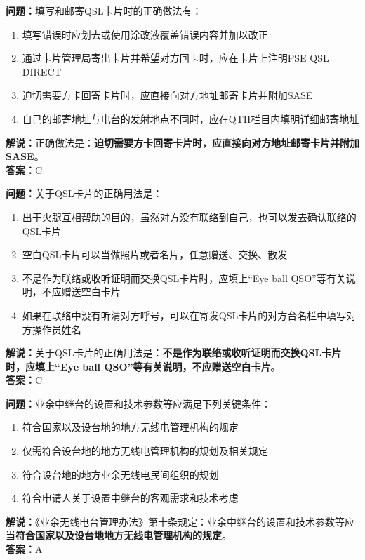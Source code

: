 \documentclass{ctexbook}
\begin{document}
\bigskip


\noindent\textbf{问题：}填写和邮寄QSL卡片时的正确做法有：
\begin{enumerate}[label=\Alph*), leftmargin=3em]
	\item 填写错误时应划去或使用涂改液覆盖错误内容并加以改正
	\item 通过卡片管理局寄出卡片并希望对方回卡时，应在卡片上注明PSE QSL DIRECT
	\item 迫切需要方卡回寄卡片时，应直接向对方地址邮寄卡片并附加SASE
	\item 自己的邮寄地址与电台的发射地点不同时，应在QTH栏目内填明详细邮寄地址
\end{enumerate}
\noindent\textbf{解说：}正确做法是：\textbf{迫切需要方卡回寄卡片时，应直接向对方地址邮寄卡片并附加SASE}。\\\noindent\textbf{答案：}C



\bigskip


\noindent\textbf{问题：}关于QSL卡片的正确用法是：
\begin{enumerate}[label=\Alph*), leftmargin=3em]
	\item 出于火腿互相帮助的目的，虽然对方没有联络到自己，也可以发去确认联络的QSL卡片
	\item 空白QSL卡片可以当做照片或者名片，任意赠送、交换、散发
	\item 不是作为联络或收听证明而交换QSL卡片时，应填上“Eye ball QSO”等有关说明，不应赠送空白卡片
	\item 如果在联络中没有听清对方呼号，可以在寄发QSL卡片的对方台名栏中填写对方操作员姓名
\end{enumerate}
\noindent\textbf{解说：}关于QSL卡片的正确用法是：\textbf{不是作为联络或收听证明而交换QSL卡片时，应填上“Eye ball QSO”等有关说明，不应赠送空白卡片}。\\\noindent\textbf{答案：}C



\bigskip


\noindent\textbf{问题：}业余中继台的设置和技术参数等应满足下列关键条件：
\begin{enumerate}[label=\Alph*), leftmargin=3em]
	\item 符合国家以及设台地的地方无线电管理机构的规定
	\item 仅需符合设台地的地方无线电管理机构的规划及相关规定
	\item 符合设台地的地方业余无线电民间组织的规划
	\item 符合申请人关于设置中继台的客观需求和技术考虑
\end{enumerate}
\noindent\textbf{解说：}《业余无线电台管理办法》第十条规定：业余中继台的设置和技术参数等应当\textbf{符合国家以及设台地地方无线电管理机构的规定}。\\\noindent\textbf{答案：}A
\end{document}
